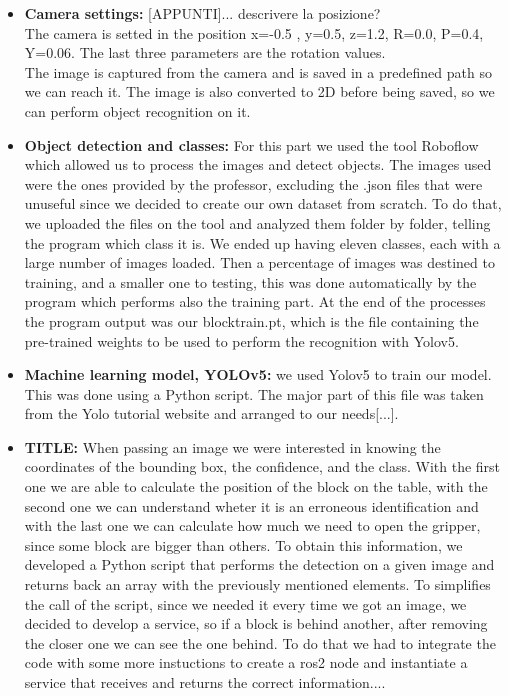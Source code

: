 \documentclass[12pt,a4paper]{article}
\begin{document}
\begin{itemize}
    \item \textbf{Camera settings:} [APPUNTI]... descrivere la posizione?\\
    The camera is setted in the position x=-0.5 , y=0.5, z=1.2, R=0.0, P=0.4, Y=0.06. The last three parameters are the rotation values.\\
    The image is captured from the camera and is saved in a predefined path so we can reach it. The image is also converted to 2D before being saved, so we can perform object recognition on it.
    \item \textbf{Object detection and classes:} For this part we used the tool Roboflow which allowed us to process the images and detect objects. The images used were the ones provided by the professor, excluding the .json files that were unuseful since we decided to create our own dataset from scratch. To do that, we uploaded the files on the tool and analyzed them folder by folder, telling the program which class it is. We ended up having eleven classes, each with a large number of images loaded. Then a percentage of images was destined to training, and a smaller one to testing, this was done automatically by the program which performs also the training part. At the end of the processes the program output was our blocktrain.pt, which is the file containing the pre-trained weights to be used to perform the recognition with Yolov5.
    \item \textbf{Machine learning model, YOLOv5:} we used Yolov5 to train our model. This was done using a Python script. The major part of this file was taken from the Yolo tutorial website and arranged to our needs[...]. 
    \item \textbf{TITLE:} When passing an image we were interested in knowing the coordinates of the bounding box, the confidence, and the class. With the first one we are able to calculate the position of the block on the table, with the second one we can understand wheter it is an erroneous identification and with the last one we can calculate how much we need to open the gripper, since some block are bigger than others. To obtain this information, we developed a Python script that performs the detection on a given image and returns back an array with the previously mentioned elements. To simplifies the call of the script, since we needed it every time we got an image, we decided to develop a service, so if a block is behind another, after removing the closer one we can see the one behind. To do that we had to integrate the code with some more instuctions to create a ros2 node and instantiate a service that receives and returns the correct information....\\

\end{itemize}
\end{document}
